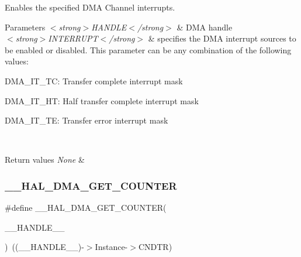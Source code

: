 Enables the specified D\+MA Channel interrupts. 


\begin{DoxyParams}{Parameters}
{\em $<$strong$>$\+H\+A\+N\+D\+L\+E$<$/strong$>$} & D\+MA handle \\
\hline
{\em $<$strong$>$\+I\+N\+T\+E\+R\+R\+U\+P\+T$<$/strong$>$} & specifies the D\+MA interrupt sources to be enabled or disabled. This parameter can be any combination of the following values\+: \begin{DoxyItemize}
\item D\+M\+A\+\_\+\+I\+T\+\_\+\+TC\+: Transfer complete interrupt mask \item D\+M\+A\+\_\+\+I\+T\+\_\+\+HT\+: Half transfer complete interrupt mask \item D\+M\+A\+\_\+\+I\+T\+\_\+\+TE\+: Transfer error interrupt mask \end{DoxyItemize}
\\
\hline
\end{DoxyParams}

\begin{DoxyRetVals}{Return values}
{\em None} & \\
\hline
\end{DoxyRetVals}
\mbox{\label{group___d_m_a___exported___macros_ga082d691311bac96641dc35a17cfe8e63}} 
\subsubsection{\texorpdfstring{\+\_\+\+\_\+\+H\+A\+L\+\_\+\+D\+M\+A\+\_\+\+G\+E\+T\+\_\+\+C\+O\+U\+N\+T\+ER}{\_\_HAL\_DMA\_GET\_COUNTER}}
{\footnotesize\ttfamily \#define \+\_\+\+\_\+\+H\+A\+L\+\_\+\+D\+M\+A\+\_\+\+G\+E\+T\+\_\+\+C\+O\+U\+N\+T\+ER(\begin{DoxyParamCaption}\item[{}]{\+\_\+\+\_\+\+H\+A\+N\+D\+L\+E\+\_\+\+\_\+ }\end{DoxyParamCaption})~((\+\_\+\+\_\+\+H\+A\+N\+D\+L\+E\+\_\+\+\_\+)-\/$>$Instance-\/$>$C\+N\+D\+TR)}



